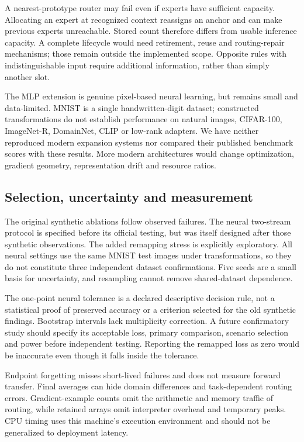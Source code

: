 A nearest-prototype router may fail even if experts have sufficient capacity. Allocating an expert at recognized context reassigns an anchor and can make previous experts unreachable. Stored count therefore differs from usable inference capacity. A complete lifecycle would need retirement, reuse and routing-repair mechanisms; those remain outside the implemented scope. Opposite rules with indistinguishable input require additional information, rather than simply another slot.

The MLP extension is genuine pixel-based neural learning, but remains small and data-limited. MNIST is a single handwritten-digit dataset; constructed transformations do not establish performance on natural images, CIFAR-100, ImageNet-R, DomainNet, CLIP or low-rank adapters. We have neither reproduced modern expansion systems nor compared their published benchmark scores with these results. More modern architectures would change optimization, gradient geometry, representation drift and resource ratios.

\subsection{Selection, uncertainty and measurement}
The original synthetic ablations follow observed failures. The neural two-stream protocol is specified before its official testing, but was itself designed after those synthetic observations. The added remapping stress is explicitly exploratory. All neural settings use the same MNIST test images under transformations, so they do not constitute three independent dataset confirmations. Five seeds are a small basis for uncertainty, and resampling cannot remove shared-dataset dependence.

The one-point neural tolerance is a declared descriptive decision rule, not a statistical proof of preserved accuracy or a criterion selected for the old synthetic findings. Bootstrap intervals lack multiplicity correction. A future confirmatory study should specify its acceptable loss, primary comparison, scenario selection and power before independent testing. Reporting the remapped loss as zero would be inaccurate even though it falls inside the tolerance.

Endpoint forgetting misses short-lived failures and does not measure forward transfer. Final averages can hide domain differences and task-dependent routing errors. Gradient-example counts omit the arithmetic and memory traffic of routing, while retained arrays omit interpreter overhead and temporary peaks. CPU timing uses this machine's execution environment and should not be generalized to deployment latency.

